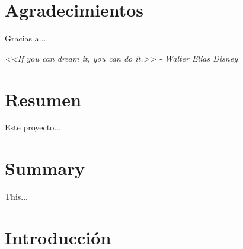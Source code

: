 \documentclass[a4paper, 12pt]{book}
\begin{document}

\chapter*{Agradecimientos}

Gracias a...

\textit{<<If you can dream it, you can do it.>> - Walter Elias Disney}


\chapter*{Resumen}

Este proyecto...


\chapter*{Summary}

This...



\tableofcontents
\cleardoublepage
\listoffigures %





\cleardoublepage
\chapter{Introducci\'on}
\label{sec:intro} %

\end{document}
